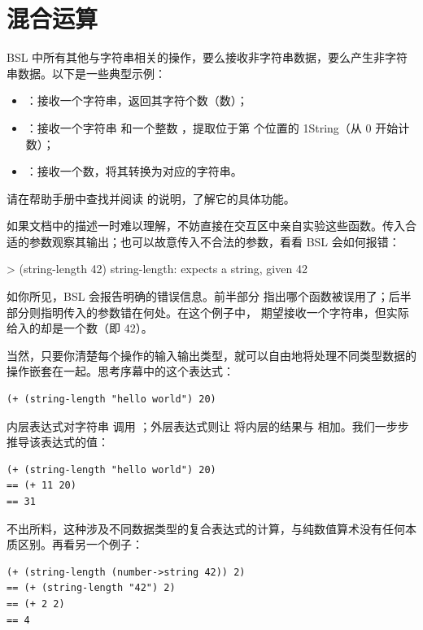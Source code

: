 \section{混合运算}
\label{sec:1.3}

BSL 中所有其他与字符串相关的操作，要么接收非字符串数据，要么产生非字符串数据。以下是一些典型示例：
\begin{itemize}
  \item {}：接收一个字符串，返回其字符个数（数）；
  \item {}：接收一个字符串  和一个整数 ，提取位于第  个位置的 1String（从 0 开始计数）；
  \item {}：接收一个数，将其转换为对应的字符串。
\end{itemize}

请在帮助手册中查找并阅读  的说明，了解它的具体功能。

如果文档中的描述一时难以理解，不妨直接在交互区中亲自实验这些函数。传入合适的参数观察其输出；也可以故意传入不合法的参数，看看 BSL 会如何报错：
\begin{replbox}
> (string-length 42)
string-length: expects a string, given 42
\end{replbox}

如你所见，BSL 会报告明确的错误信息。前半部分  指出哪个函数被误用了；后半部分则指明传入的参数错在何处。在这个例子中， 期望接收一个字符串，但实际给入的却是一个数（即 42）。

当然，只要你清楚每个操作的输入输出类型，就可以自由地将处理不同类型数据的操作嵌套在一起。思考序幕中的这个表达式：
\begin{lstlisting}[language=BSL]
(+ (string-length "hello world") 20)
\end{lstlisting}

内层表达式对字符串  调用 ；外层表达式则让 \code{+} 将内层的结果与  相加。我们一步步推导该表达式的值：
\begin{lstlisting}[language=BSL]
(+ (string-length "hello world") 20)
== (+ 11 20)
== 31
\end{lstlisting}

不出所料，这种涉及不同数据类型的复合表达式的计算，与纯数值算术没有任何本质区别。再看另一个例子：
\begin{lstlisting}[language=BSL]
(+ (string-length (number->string 42)) 2)
== (+ (string-length "42") 2)
== (+ 2 2)
== 4
\end{lstlisting}

